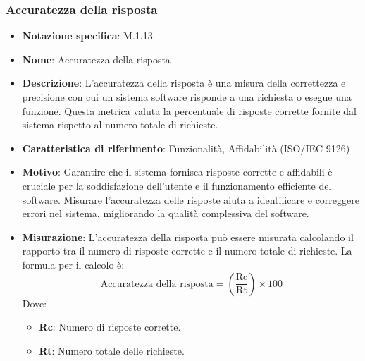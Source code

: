 \subsubsection{Accuratezza della risposta}
\begin{itemize}
    \item \textbf{Notazione specifica}: M.1.13
    \item \textbf{Nome}: Accuratezza della risposta
    \item \textbf{Descrizione}: L'accuratezza della risposta è una misura della correttezza e precisione con cui un sistema software risponde a una richiesta o esegue una funzione. Questa metrica valuta la percentuale di risposte corrette fornite dal sistema rispetto al numero totale di richieste.
    \item \textbf{Caratteristica di riferimento}: Funzionalità, Affidabilità (ISO/IEC 9126)
    \item \textbf{Motivo}: Garantire che il sistema fornisca risposte corrette e affidabili è cruciale per la soddisfazione dell'utente e il funzionamento efficiente del software. Misurare l'accuratezza delle risposte aiuta a identificare e correggere errori nel sistema, migliorando la qualità complessiva del software.
    \item \textbf{Misurazione}: L'accuratezza della risposta può essere misurata calcolando il rapporto tra il numero di risposte corrette e il numero totale di richieste. La formula per il calcolo è:
    \begin{equation}
    \text{Accuratezza della risposta} = \left( \frac{\text{Rc}}{\text{Rt}} \right) \times 100
    \end{equation}
    Dove:
    \begin{itemize}
        \item \textbf{Rc}: Numero di risposte corrette.
        \item \textbf{Rt}: Numero totale delle richieste.
    \end{itemize}
\end{itemize}
